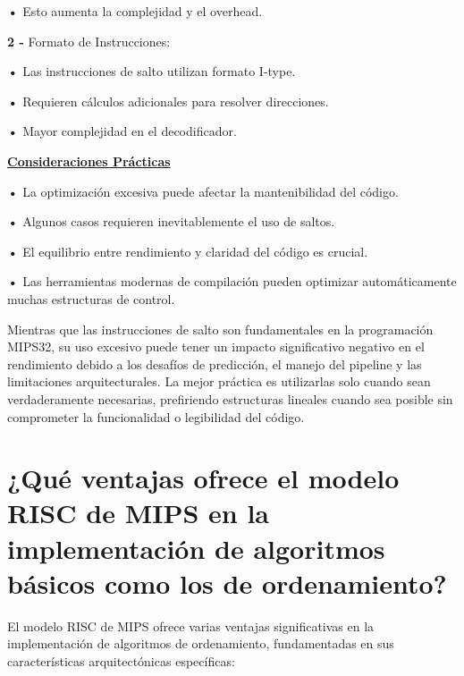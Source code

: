 \documentclass{article}
\begin{document}
\textbf{•   } { Esto aumenta la complejidad y el overhead.}

\quad

\textbf{2 -  } { Formato de Instrucciones:}

\quad

\textbf{•   } { Las instrucciones de salto utilizan formato I-type.}

\textbf{•   } { Requieren cálculos adicionales para resolver direcciones.}

\textbf{•   } { Mayor complejidad en el decodificador.}

\quad

\textbf{\underline{Consideraciones Prácticas}}

\quad

\textbf{•   } { La optimización excesiva puede afectar la mantenibilidad del código.}

\textbf{•   } { Algunos casos requieren inevitablemente el uso de saltos.}

\textbf{•   } { El equilibrio entre rendimiento y claridad del código es crucial.}

\textbf{•   } { Las herramientas modernas de compilación pueden optimizar automáticamente muchas estructuras de control.}

\quad

{ Mientras que las instrucciones de salto son fundamentales en la programación MIPS32, su uso excesivo puede tener un impacto significativo negativo en el rendimiento debido a los desafíos de predicción, el manejo del pipeline y las limitaciones arquitecturales. La mejor práctica es utilizarlas solo cuando sean verdaderamente necesarias, prefiriendo estructuras lineales cuando sea posible sin comprometer la funcionalidad o legibilidad del código.}

\quad
\newpage






\section{¿Qué ventajas ofrece el modelo RISC de MIPS en la implementación de algoritmos básicos como los de ordenamiento?}

\quad

{El modelo RISC de MIPS ofrece varias ventajas significativas en la implementación de algoritmos de ordenamiento, fundamentadas en sus características arquitectónicas específicas:}

\quad
\end{document}

